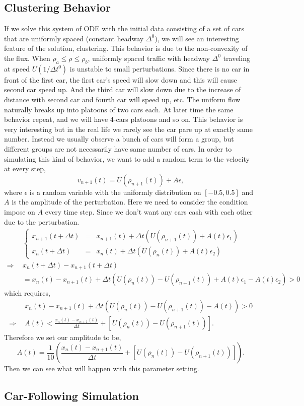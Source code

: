 \documentclass[10pt]{article}
\begin{document}
\subsection{Clustering Behavior}

If we solve this system of ODE with the initial data consisting of a set of cars that are uniformly spaced (constant headway $\Delta^0$), we will see an interesting feature of the solution, clustering. This behavior is due to the non-convexity of the flux. When $\rho_a\leq\rho\leq\rho_b$, uniformly spaced traffic with headway $\Delta^0$ traveling at speed $U(1/\Delta t^0)$ is unstable to small perturbations. Since there is no car in front of the first car, the first car's speed will slow down and this will cause second car speed up. And the third car will slow down due to the increase of distance with second car and fourth car will speed up, etc. The uniform flow naturally breaks up into platoons of two cars each. At later time the same behavior repeat, and we will have 4-cars platoons and so on.
\vskip 8pt
This behavior is very interesting but in the real life we rarely see the car pare up at exactly same number. Instead we usually observe a bunch of cars will form a group, but different groups are not necessarily have same number of cars. In order to simulating this kind of behavior, we want to add a random term to the velocity at every step,
\[v_{n+1}(t)=U(\rho_{n+1}(t))+A\epsilon,\]
where $\epsilon$ is a random variable with the uniformly distribution on $[-0.5,0.5]$ and $A$ is the amplitude of the perturbation. Here we need to consider the condition impose on $A$ every time step. Since we don't want any cars cash with each other due to the perturbation.
\begin{align*}
&\left\{\begin{array}{lll}
x_{n+1}(t+\Delta t)&=&x_{n+1}(t)+\Delta t(U(\rho_{n+1}(t))+A(t)\epsilon_1)\\
x_{n}(t+\Delta t)&=&x_{n}(t)+\Delta t(U(\rho_{n}(t))+A(t)\epsilon_2)
\end{array}\right.\\
\Rightarrow~~&x_n(t+\Delta t)-x_{n+1}(t+\Delta t)\\
&=x_n(t)-x_{n+1}(t)+\Delta t(U(\rho_{n}(t))-U(\rho_{n+1}(t))+A(t)\epsilon_1-A(t)\epsilon_2)>0
\end{align*}
which requires,
\begin{align*}
&x_n(t)-x_{n+1}(t)+\Delta t(U(\rho_{n}(t))-U(\rho_{n+1}(t))-A(t))>0\\
\Rightarrow~~&A(t)<\frac{x_{n}(t)-x_{n+1}(t)}{\Delta t}+[U(\rho_{n}(t))-U(\rho_{n+1}(t))].
\end{align*}
Therefore we set our amplitude to be,
\[A(t)=\frac{1}{10}\left(\frac{x_{n}(t)-x_{n+1}(t)}{\Delta t}+[U(\rho_{n}(t))-U(\rho_{n+1}(t))]\right).\]
Then we can see what will happen with this parameter setting.
\subsection{Car-Following Simulation}
\end{document}
